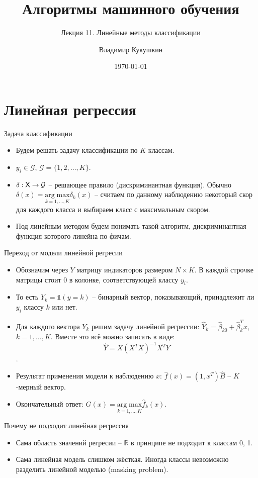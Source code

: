 \documentclass[9pt]{beamer}
\title{Алгоритмы машинного обучения}
\subtitle{Лекция 11. Линейные методы классификации}
\author{Владимир Кукушкин}
\institute{СПбГЭУ - 2020}
\date{\today}
\begin{document}
\titlepage

\section{Линейная регрессия}

\begin{frame}{Задача классификации}
\begin{itemize}
    \item Будем решать задачу классификации по $K$ классам.
    \item $y_i \in \mathcal{G}$, $\mathcal{G} = \{1, 2, \ldots, K\}$.
    \item $\delta: \sf{X} \rightarrow \mathcal{G}$ -- решающее правило (дискриминантная функция). Обычно $\delta(x) = \underset{k=1,\ldots,K}{\mathrm{arg\;max}}\delta_k(x)$ -- считаем по данному наблюдению некоторый скор для каждого класса и выбираем класс с максимальным скором.
    \item Под линейным методом будем понимать такой алгоритм, дискриминантная функция которого линейна по фичам.
\end{itemize}
    
\end{frame}

\begin{frame}{Переход от модели линейной регресии}
    \begin{itemize}
        \item Обозначим через $Y$ матрицу индикаторов размером $N\times K$. В каждой строчке матрицы стоит 0 в колонке, соответствующей классу $y_i$.
        \item То есть $Y_k = \mathds{1}(y=k)$ -- бинарный вектор, показывающий, принадлежит ли $y_i$ классу $k$ или нет.
        \item Для каждого вектора $Y_k$ решим задачу линейной регрессии: $\hat Y_k = \hat\beta_{k0} +\hat\beta_{k}^Tx$, $k=1,\ldots,K$. Вместе это всё можно записать в виде:
        $$\hat Y = X(X^TX)^{-1}X^TY$$.
        \item Результат применения модели к наблюдению $x$: $\hat f(x) = (1, x^T)\hat B$ -- $K$-мерный вектор.
        \item Окончательный ответ: $\hat G(x) = \underset{k=1,\ldots,K}{\mathrm{arg\;max}}\hat f_k(x)$.
        \end{itemize}
\end{frame}

\begin{frame}{Почему не подходит линейная регрессия}

\begin{itemize}
    \item Сама область значений регресии -- $\mathbb{R}$ в принципе не подходит к классам 0, 1.
    \item Сама линейная модель слишком жёсткая. Иногда классы невозможно разделить линейной моделью (masking problem).
\end{itemize}    
\end{frame}
\end{document}
